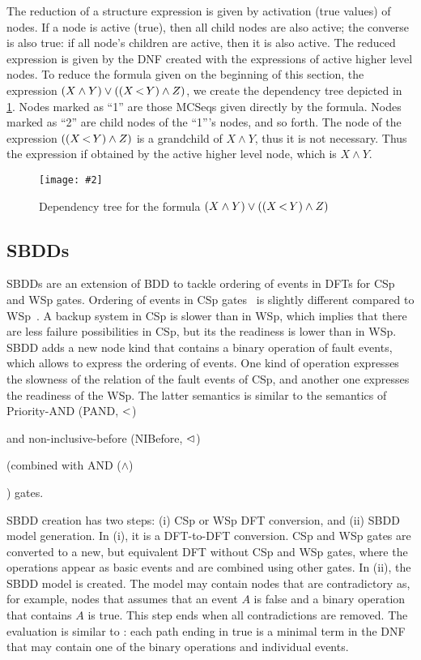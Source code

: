 \documentclass[en,twoside,onehalfspacing,phd]{risethesis}
\newcommand{\includegraphicsaspectratio}[2][1]{%
  \texttt{[image: \#2]}%
}
\def\andtext{AND ($\land$)%
  \gdef\andtext{AND\xspace}%
  \xspace
}
\def\pandtext{Priority-AND (PAND, $\pand$)%
  \gdef\pandtext{PAND\xspace}%
  \xspace
}
\def\nibeforetext{non-inclusive-before (NIBefore, $\nibefore$)%
  \gdef\nibeforetext{NI-Before\xspace}%
  \xspace
}
\newcommand{\parsin}[1]{\ensuremath\left( #1 \right)}
\def\pand{\ensuremath\operatorname{<}}
\def\nibefore{\ensuremath\operatorname{\lhd}}
\begin{document}
The reduction of a structure expression is given by activation (true values) of nodes.
If a node is active (true), then all child nodes are also active; the converse is also true: if all node's children are active, then it is also active.
The reduced expression is given by the \ac{DNF} created with the expressions of active higher level nodes.
To reduce the formula given on the beginning of this section, the expression $\parsin{X \land Y} \lor \parsin{\parsin{X \pand Y} \land Z}$, we create the dependency tree depicted in \cref{fig:dependency-tree-reduction}.
Nodes marked as ``1'' are those \acp{MCSeq} given directly by the formula.
Nodes marked as ``2'' are child nodes of the ``1'''s nodes, and so forth.
The node of the expression $\parsin{\parsin{X \pand Y} \land Z}$ is a grandchild of $X \land Y$, thus it is not necessary.
Thus the expression if obtained by the active higher level node, which is $X \land Y$.

\begin{figure}
  \centering
  \includegraphicsaspectratio[0.7]{dependency-tree-reduction}
  \caption{Dependency tree for the formula $\parsin{X \land Y} \lor \parsin{\parsin{X \pand Y} \land Z}$}
  \label{fig:dependency-tree-reduction}
\end{figure}

\subsection{\Aclp*{SBDD}}
\label{sec:sbdd}

\Acp{SBDD} are an extension of \ac{BDD} to tackle ordering of events in \acp{DFT} for \ac{CSp} and \ac{WSp} gates.
Ordering of events in \ac{CSp} gates~\cite{XTD2012} is slightly different compared to \ac{WSp}~\cite{TXD2011}.
A backup system in \ac{CSp} is slower than in \ac{WSp}, which implies that there are less failure possibilities in \ac{CSp}, but its the readiness is lower than in \ac{WSp}.
\Ac{SBDD} adds a new node kind that contains a binary operation of fault events, which allows to express the ordering of events.
One kind of operation expresses the slowness of the relation of the fault events of \ac{CSp}, and another one expresses the readiness of the \ac{WSp}.
The latter semantics is similar to the semantics of \pandtext and \nibeforetext (combined with \andtext) gates.

\Ac{SBDD} creation has two steps: (i) \ac{CSp} or \ac{WSp} \ac{DFT} conversion, and (ii) \ac{SBDD} model generation.
In (i), it is a \ac{DFT}-to-\ac{DFT} conversion.
\Ac{CSp} and \ac{WSp} gates are converted to a new, but equivalent \ac{DFT} without \ac{CSp} and \ac{WSp} gates, where the operations appear as basic events and are combined using other gates.
In (ii), the \ac{SBDD} model is created.
The model may contain nodes that are contradictory as, for example, nodes that assumes that an event $A$ is false and a binary operation that contains $A$ is true.
This step ends when all contradictions are removed.
The evaluation is similar to : each path ending in true is a minimal term in the \ac{DNF} that may contain one of the binary operations and individual events.
\end{document}
